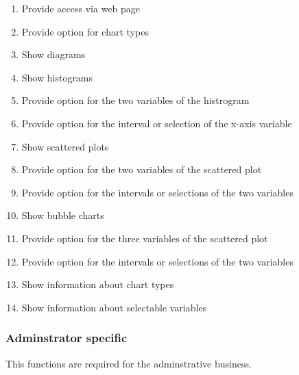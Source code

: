 \begin{enumerate}
  \item Provide access via web page
    
  \item Provide option for chart types
  
  \item Show diagrams
  
  \item Show histograms %
  
  \item Provide option for the two variables of the histrogram
  
  \item Provide option for the interval or selection of the x-axis variable %
  
  \item Show scattered plots %
  
  \item Provide option for the two variables of the scattered plot
  
  \item Provide option for the intervals or selections of the two variables %
  
  
  
  \item Show bubble charts %
  
  \item Provide option for the three variables of the scattered plot
  
  \item Provide option for the intervals or selections of the two variables %
  
  \item Show information about chart types
  
  \item Show information about selectable variables
  
\end{enumerate}


\subsubsection*{Adminstrator specific} 
This functions are required for the adminstrative business.

